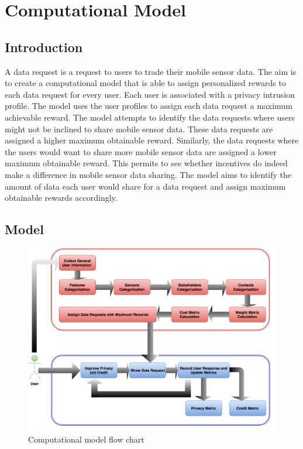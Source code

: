 \chapter{Computational Model} \label{model}

\newcommand{\numcategories}[0]{$n_{cat}$ }
\newcommand{\numsubcategories}[0]{$cat$ }
\newcommand{\numsensors}[0]{$N_S$ }
\newcommand{\numstakeholders}[0]{$N_{DC}$ }
\newcommand{\numcontexts}[0]{$N_C$ }
\newcommand{\numquestions}[0]{$n_{dr}$ } 
\newcommand{\numsubfeatures}[0]{$n_{sf}$ } 



\section{Introduction}
A data request is a request to users to trade their mobile sensor data. The aim is to create a computational model that is able to assign personalized rewards to each data request for every user.
Each user is associated with a privacy intrusion profile. The model uses the user profiles to assign each data request a maximum achievable reward. The model attempts to identify the data requests where users might not be inclined to share mobile sensor data. These data requests are assigned a higher maximum obtainable reward. Similarly, the data requests where the users would want to share more mobile sensor data
are assigned a lower maximum obtainable reward. This permits to see whether incentives do indeed make a difference in mobile sensor
data sharing. The model aims to identify the amount of data each user would share for a data request and assign maximum obtainable rewards accordingly.

\section{Model}

\begin{figure}[ht!]
\centering
\includegraphics[width=\textwidth,keepaspectratio	]{./images/model_building_blocks}
\caption{Computational model flow chart \label{model_blocks}}
\end{figure}

